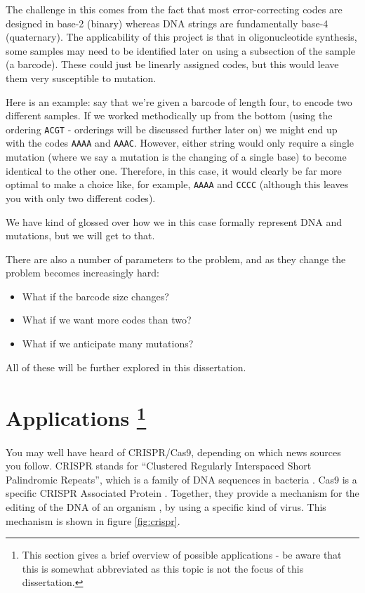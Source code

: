 \documentclass[a4paper,11pt]{article}
\begin{document}

    The challenge in this comes from the fact that most error-correcting codes
    are designed in base-2 (binary) whereas DNA strings are fundamentally
    base-4 (quaternary). The applicability of this project is that in
    oligonucleotide synthesis, some samples may need to be identified later on
    using a subsection of the sample (a barcode). These could just be linearly
    assigned codes, but this would leave them very susceptible to mutation.

    Here is an example: say that we're given a barcode of length four, to encode
    two different samples. If we worked methodically up from the bottom (using
    the ordering \texttt{ACGT} - orderings will be discussed further later on)
    we might end up with the codes \texttt{AAAA} and \texttt{AAAC}. However,
    either string would only require a single mutation (where we say a mutation
    is the changing of a single base) to become identical to the other one.
    Therefore, in this case, it would clearly be far more optimal to make a
    choice like, for example, \texttt{AAAA} and \texttt{CCCC} (although this
    leaves you with only two different codes).

    We have kind of glossed over how we in this case formally represent DNA and
    mutations, but we will get to that.

    There are also a number of parameters to the problem, and as they change
    the problem becomes increasingly hard:

    \begin{itemize}
    \item What if the barcode size changes?
    \item What if we want more codes than two?
    \item What if we anticipate many mutations?
    \end{itemize}

    All of these will be further explored in this dissertation.

    \section[Applications]{Applications \footnote{This section gives a brief
    overview of possible applications - be aware that this is somewhat
    abbreviated as this topic is not the focus of this dissertation.}}

    You may well have heard of CRISPR/Cas9, depending on which news sources you
    follow. CRISPR stands for ``Clustered Regularly Interspaced Short
    Palindromic Repeats'', which is a family of DNA sequences in bacteria
    \cite{CRISPRDailyMail,CRISPRImmune2010Horvath,WikiCrispr}. Cas9 is a
    specific CRISPR Associated Protein \cite{WikiCas9}. Together, they provide a
    mechanism for the editing of the DNA of an organism
    \cite{CRISPER2016Finneran}, by using a specific kind of virus.  This
    mechanism is shown in figure \ref{fig:crispr}.
\end{document}
